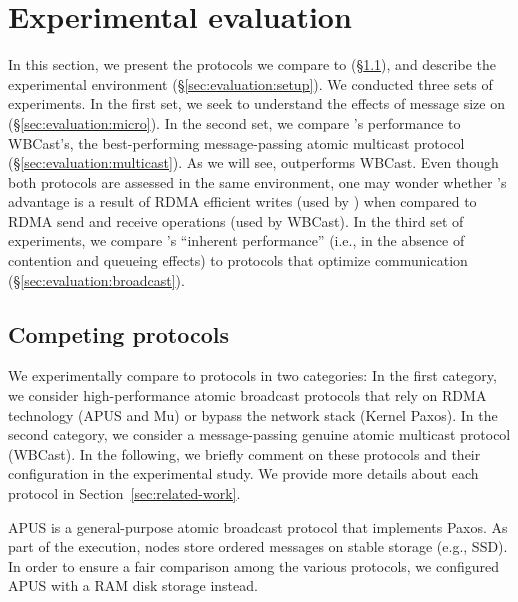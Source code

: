 \section{Experimental evaluation}
\label{sec:experimental-evaluation}

In this section, we present the protocols we compare \libname to (\S\ref{sec:comp}), and
describe the experimental environment (\S\ref{sec:evaluation:setup}).
We conducted three sets of experiments.
In the first set, we seek to understand the effects of message size on \libname (\S\ref{sec:evaluation:micro}).
In the second set, we compare \libname's performance to WBCast's, the best-performing message-passing atomic multicast protocol (\S\ref{sec:evaluation:multicast}).
As we will see, \libname outperforms WBCast.
Even though both protocols are assessed in the same environment, one may wonder whether \libname's advantage is a result of RDMA efficient writes (used by \libname) when compared to RDMA send and receive operations (used by WBCast).
In the third set of experiments, we compare \libname's ``inherent performance'' (i.e., in the absence of contention and queueing effects) to protocols that optimize communication (\S\ref{sec:evaluation:broadcast}).

\subsection{Competing protocols}
\label{sec:comp}

We experimentally compare \libname to protocols in two categories:
In the first category, we consider high-performance atomic broadcast protocols that rely on RDMA technology (APUS and Mu) or bypass the network stack (Kernel Paxos).
In the second category, we consider a message-passing genuine atomic multicast protocol (WBCast).
In the following, we briefly comment on these protocols and their configuration in the experimental study.
We provide more details about each protocol in Section~\ref{sec:related-work}.

APUS is a general-purpose atomic broadcast protocol that implements Paxos.
As part of the execution, nodes store ordered messages on stable storage (e.g., SSD).
In order to ensure a fair comparison among the various protocols, we configured APUS with a RAM disk storage instead.

